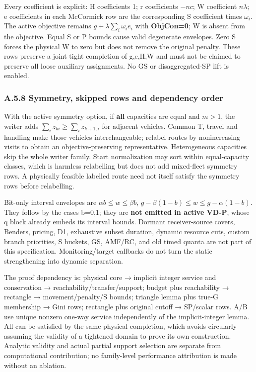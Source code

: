 \documentclass[
  american,
  11pt,
]{article}
\begin{document}
Every coefficient is explicit: H coefficients 1; r coefficients \(-nc\);
W coefficient \(n\lambda\); e coefficients in each McCormick row are the
corresponding S coefficient times \(\omega_i\). The active objective
remains \(g+\lambda\sum_i\omega_i e_i\) with \textbf{ObjCon=0}; W is
absent from the objective. Equal S or P bounds cause valid degenerate
envelopes. Zero S forces the physical W to zero but does not remove the
original penalty. These rows preserve a joint tight completion of
g,e,H,W and must not be claimed to preserve all loose auxiliary
assignments. No GS or disaggregated-SP lift is enabled.

\subsubsection{A.5.8 Symmetry, skipped rows and dependency
order}\label{a.5.8-symmetry-skipped-rows-and-dependency-order}

With the active symmetry option, if \textbf{all} capacities are equal
and \(m>1\), the writer adds \(\sum_i z_{ki}\ge\sum_i z_{k+1,i}\) for
adjacent vehicles. Common T, travel and handling make those vehicles
interchangeable; relabel routes by nonincreasing visits to obtain an
objective-preserving representative. Heterogeneous capacities skip the
whole writer family. Start normalization may sort within equal-capacity
classes, which is harmless relabelling but does not add mixed-fleet
symmetry rows. A physically feasible labelled route need not itself
satisfy the symmetry rows before relabelling.

Bit-only interval envelopes are \(\alpha b\le w\le\beta b\),
\(g-\beta(1-b)\le w\le g-\alpha(1-b)\). They follow by the cases b=0,1;
they are \textbf{not emitted in active VD-P}, whose q block already
embeds its interval bounds. Dormant receiver-source covers, Benders,
pricing, D1, exhaustive subset duration, dynamic resource cuts, custom
branch priorities, S buckets, GS, AMF/RC, and old timed quanta are not
part of this specification. Monitoring/target callbacks do not turn the
static strengthening into dynamic separation.

The proof dependency is: physical core → implicit integer service and
conservation → reachability/transfer/support; budget plus reachability →
rectangle → movement/penalty/S bounds; triangle lemma plus true-G
membership → Gini rows; rectangle plus original cutoff → SP/scalar rows.
A/B use unique nonzero one-way service independently of the
implicit-integer lemma. All can be satisfied by the same physical
completion, which avoids circularly assuming the validity of a tightened
domain to prove its own construction. Analytic validity and actual
partial support selection are separate from computational contribution;
no family-level performance attribution is made without an ablation.
\end{document}
